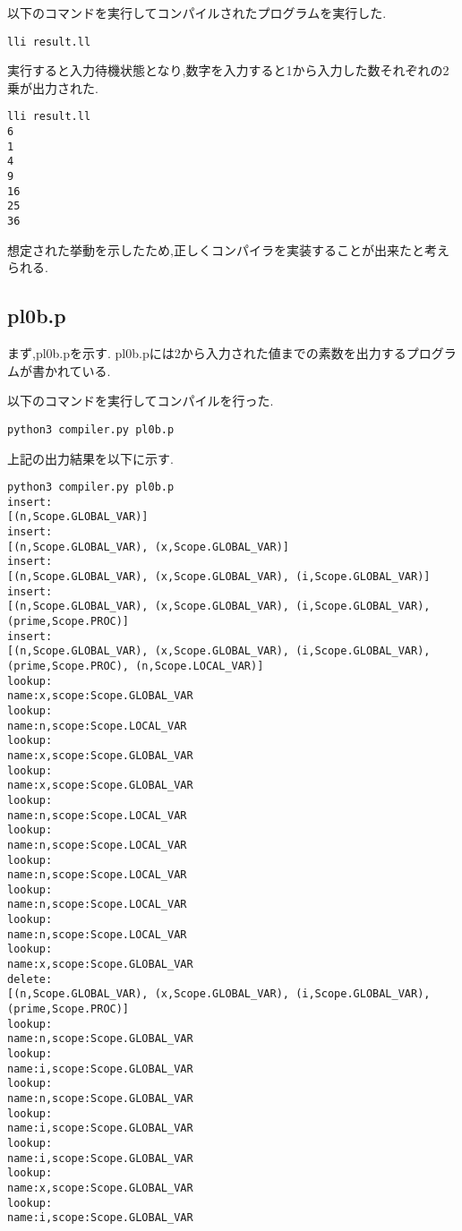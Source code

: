 \documentclass[main]{subfiles}
\begin{document}
以下のコマンドを実行してコンパイルされたプログラムを実行した.
\begin{oframed}
\begin{verbatim}
lli result.ll
\end{verbatim}
\end{oframed}
実行すると入力待機状態となり,数字を入力すると1から入力した数それぞれの2乗が出力された.
\begin{lstlisting}[caption=pl0a.pをコンパイルしたプログラムを実行]
lli result.ll
6
1
4
9
16
25
36
\end{lstlisting}
想定された挙動を示したため,正しくコンパイラを実装することが出来たと考えられる.

\subsection{pl0b.p}
まず,pl0b.pを示す.
pl0b.pには2から入力された値までの素数を出力するプログラムが書かれている.

以下のコマンドを実行してコンパイルを行った.
\begin{oframed}
\begin{verbatim}
python3 compiler.py pl0b.p
\end{verbatim}
\end{oframed}
上記の出力結果を以下に示す.
\begin{lstlisting}[caption=python3 compiler.py pl0b.pの出力]
python3 compiler.py pl0b.p
insert:
[(n,Scope.GLOBAL_VAR)]
insert:
[(n,Scope.GLOBAL_VAR), (x,Scope.GLOBAL_VAR)]
insert:
[(n,Scope.GLOBAL_VAR), (x,Scope.GLOBAL_VAR), (i,Scope.GLOBAL_VAR)]
insert:
[(n,Scope.GLOBAL_VAR), (x,Scope.GLOBAL_VAR), (i,Scope.GLOBAL_VAR), (prime,Scope.PROC)]
insert:
[(n,Scope.GLOBAL_VAR), (x,Scope.GLOBAL_VAR), (i,Scope.GLOBAL_VAR), (prime,Scope.PROC), (n,Scope.LOCAL_VAR)]
lookup:
name:x,scope:Scope.GLOBAL_VAR
lookup:
name:n,scope:Scope.LOCAL_VAR
lookup:
name:x,scope:Scope.GLOBAL_VAR
lookup:
name:x,scope:Scope.GLOBAL_VAR
lookup:
name:n,scope:Scope.LOCAL_VAR
lookup:
name:n,scope:Scope.LOCAL_VAR
lookup:
name:n,scope:Scope.LOCAL_VAR
lookup:
name:n,scope:Scope.LOCAL_VAR
lookup:
name:n,scope:Scope.LOCAL_VAR
lookup:
name:x,scope:Scope.GLOBAL_VAR
delete:
[(n,Scope.GLOBAL_VAR), (x,Scope.GLOBAL_VAR), (i,Scope.GLOBAL_VAR), (prime,Scope.PROC)]
lookup:
name:n,scope:Scope.GLOBAL_VAR
lookup:
name:i,scope:Scope.GLOBAL_VAR
lookup:
name:n,scope:Scope.GLOBAL_VAR
lookup:
name:i,scope:Scope.GLOBAL_VAR
lookup:
name:i,scope:Scope.GLOBAL_VAR
lookup:
name:x,scope:Scope.GLOBAL_VAR
lookup:
name:i,scope:Scope.GLOBAL_VAR
\end{lstlisting}
\end{document}
